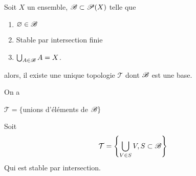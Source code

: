 \documentclass[french,a4paper,10pt]{article}
\begin{document}
			\begin{proposition}
				Soit $X$ un ensemble, $\mathscr{B}\subset\mathscr{P}(X)$ telle que
					\begin{enumerate}[label=$(\roman*)$]
						\item $\varnothing\in\mathscr{B}$
						
						\item Stable par intersection finie
						
						\item $\bigcup_{A\in \mathscr{B}}A=X$.
					\end{enumerate}
				alors, il existe une unique topologie $\mathcal T$ dont $\mathscr{B}$ est une base.
			\end{proposition}
			\begin{myproof}
				On a
					\begin{center}
						$\mathcal T=\{$unions d'éléments de $\mathscr{B}\}$
					\end{center}
				Soit
					\[\begin{aligned}
						\mathcal T = \left\{\bigcup_{V\in S}V,S\subset \mathscr{B}\right\}
					\end{aligned}\]
				Qui est stable par intersection.
			\end{myproof}
\end{document}

